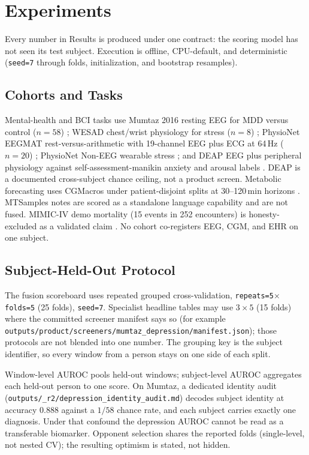 \section{Experiments}
\label{sec:experiments}

Every number in Results is produced under one contract: the scoring model has not seen its test
subject. Execution is offline, CPU-default, and deterministic (\texttt{seed=7} through folds,
initialization, and bootstrap resamples).

\subsection{Cohorts and Tasks}
\label{sec:cohorts}

Mental-health and BCI tasks use Mumtaz 2016 resting EEG for MDD versus control ($n=58$)
\cite{mumtaz2016}; WESAD chest/wrist physiology for stress ($n=8$) \cite{wesad}; PhysioNet
EEGMAT rest-versus-arithmetic with 19-channel EEG plus ECG at 64\,Hz ($n=20$) \cite{eegmat};
PhysioNet Non-EEG wearable stress \cite{noneeg}; and DEAP EEG plus peripheral physiology against
self-assessment-manikin anxiety and arousal labels \cite{deap}. DEAP is a documented
cross-subject chance ceiling, not a product screen. Metabolic forecasting uses CGMacros under
patient-disjoint splits at 30--120\,min horizons \cite{cgmacros}. MTSamples notes are scored as
a standalone language capability and are not fused. MIMIC-IV demo mortality (15 events in 252
encounters) is honesty-excluded as a validated claim \cite{mimic}. No cohort co-registers EEG,
CGM, and EHR on one subject.

\subsection{Subject-Held-Out Protocol}
\label{sec:cv}

The fusion scoreboard uses repeated grouped cross-validation, \texttt{repeats=5}$\times$\texttt{folds=5}
(25 folds), \texttt{seed=7}. Specialist headline tables may use $3\times5$ (15 folds) where the
committed screener manifest says so (for example
\texttt{outputs/product/screeners/mumtaz\_depression/manifest.json}); those protocols are not
blended into one number. The grouping key is the subject identifier, so every window from a person
stays on one side of each split.

Window-level AUROC pools held-out windows; subject-level AUROC aggregates each held-out person
to one score. On Mumtaz, a dedicated identity audit
(\texttt{outputs/\_r2/depression\_identity\_audit.md}) decodes subject identity at accuracy
$0.888$ against a $1/58$ chance rate, and each subject carries exactly one diagnosis. Under that
confound the depression AUROC cannot be read as a transferable biomarker. Opponent selection
shares the reported folds (single-level, not nested CV); the resulting optimism is stated, not
hidden.

